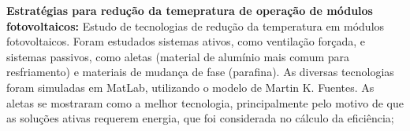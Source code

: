 \textbf{Estratégias para redução da temepratura de operação de módulos
fotovoltaicos:}
Estudo de tecnologias de redução da temperatura em módulos fotovoltaicos. Foram
estudados sistemas ativos, como ventilação forçada, e sistemas passivos,  como
aletas (material de alumínio mais comum para resfriamento) e materiais de
mudança de fase (parafina). As diversas tecnologias foram simuladas em MatLab,
utilizando o modelo de Martin K. Fuentes. As aletas se mostraram como a melhor
tecnologia, principalmente pelo motivo de que as soluções ativas requerem
energia, que foi considerada no cálculo da eficiência;
